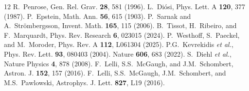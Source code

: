 \documentclass[twocolumn]{article}
\begin{document}
\begin{thebibliography}{12}
 R.~Penrose, Gen. Rel. Grav. {\bf 28}, 581 (1996).
 L.~Di\'osi, Phys. Lett. A {\bf 120}, 377 (1987).
 P.~Epstein, Math. Ann. {\bf 56}, 615 (1903).
 P.~Sarnak and A.~Str\"ombergsson, Invent. Math.
  {\bf 165}, 115 (2006).
 B.~Tissot, H.~Ribeiro, and F.~Marquardt,
  Phys. Rev. Research {\bf 6}, 023015 (2024).
 P.~Westhoff, S.~Paeckel, and M.~Moroder,
  Phys. Rev. A {\bf 112}, L061304 (2025).
 P.G.~Kevrekidis {\it et al.},
  Phys. Rev. Lett. {\bf 93}, 080403 (2004).
 Nature {\bf 606}, 683 (2022).
 S.~Diehl {\it et al.}, Nature Physics {\bf 4},
  878 (2008).
 F.~Lelli, S.S.~McGaugh, and J.M.~Schombert,
  Astron. J. {\bf 152}, 157 (2016).
 F.~Lelli, S.S.~McGaugh, J.M.~Schombert, and
  M.S.~Pawlowski, Astrophys. J. Lett. {\bf 827}, L19 (2016).
\end{thebibliography}
\end{document}
